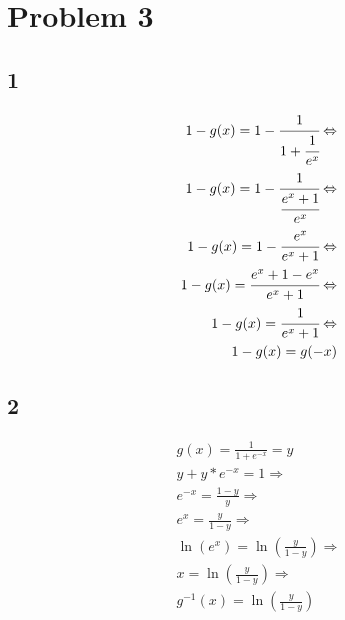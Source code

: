 \section{Problem 3}
\subsection{1}
\begin{align*}
1-g(x) = 1 - \cfrac{1}{1+\cfrac{1}{{e^x}}} \Leftrightarrow \\
1-g(x) = 1 - \cfrac{1}{\cfrac{e^x + 1}{e^x}} \Leftrightarrow \\
1-g(x) = 1 - \cfrac{e^x}{e^x + 1} \Leftrightarrow \\
1-g(x) = \cfrac{e^x+1-e^x}{e^x+1} \Leftrightarrow \\
1-g(x) = \cfrac{1}{e^x+1} \Leftrightarrow \\
1-g(x) = g(-x)
\end{align*}
\subsection{2}
\begin{align*}
g(x) = \frac{1}{1+e^{-x}} = y \\
y+y*e^{-x} = 1 \Rightarrow \\
e^{-x} = \frac{1-y}{y} \Rightarrow \\
e^x = \frac{y}{1-y} \Rightarrow \\
\ln(e^x) = \ln(\frac{y}{1-y}) \Rightarrow \\
x = \ln(\frac{y}{1-y}) \Rightarrow \\
g^{-1}(x) = \ln(\frac{y}{1-y})
\end{align*}
